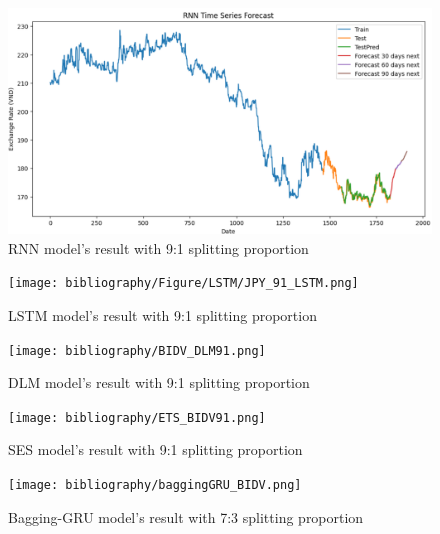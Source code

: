 \documentclass{ieeeojies}
\begin{document}
\begin{figure}[H]
  \centering
  \begin{minipage}{0.8\linewidth}
    \centering
    \includegraphics[width=\linewidth]{RNN_JPY.png}
    \caption{RNN model's result with 9:1 splitting proportion}
    \label{fig26}
  \end{minipage}
\end{figure}
\begin{figure}[H]
  \centering
  \begin{minipage}{0.8\linewidth}
    \centering
    \texttt{[image: bibliography/Figure/LSTM/JPY\_91\_LSTM.png]}
    \caption{LSTM model's result with 9:1 splitting proportion}
    \label{fig8}
  \end{minipage}
\end{figure}
\begin{figure}[H]
  \centering
  \begin{minipage}{0.8\linewidth}
    \centering
        \texttt{[image: bibliography/BIDV\_DLM91.png]}
    \caption{DLM model's result with 9:1 splitting proportion}
    \label{fig27}
  \end{minipage}
\end{figure}
\begin{figure}[H]
  \centering
  \begin{minipage}{0.8\linewidth}
    \centering
        \texttt{[image: bibliography/ETS\_BIDV91.png]}
    \caption{SES model's result with 9:1 splitting proportion}
    \label{fig28}
  \end{minipage}
\end{figure}
\begin{figure}[H]
  \centering
  \begin{minipage}{0.8\linewidth}
    \centering
        \texttt{[image: bibliography/baggingGRU\_BIDV.png]}
    \caption{Bagging-GRU model's result with 7:3 splitting proportion}
    \label{fig28}
  \end{minipage}
\end{figure}
\end{document}
